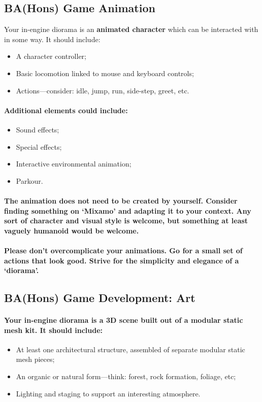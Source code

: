 \documentclass{../../fal_assignment}
\begin{document}
\subsection*{BA(Hons) Game Animation}

Your in-engine diorama is an \textbf{animated character} which can be interacted with in some way. It should include:
\begin{itemize}
\item A character controller;
\item Basic locomotion linked to mouse and keyboard controls;
\item Actions---consider: idle, jump, run, side-step, greet, etc.
\end{itemize}
\paragraph{Additional elements could include:}
\begin{itemize}
\item Sound effects;
\item Special effects;
\item Interactive environmental animation; 
\item Parkour.
\end{itemize}
\paragraph{The animation does not need to be created by yourself. Consider finding something on `Mixamo' and adapting it to your context. Any sort of character and visual style is welcome, but something at least vaguely humanoid would be welcome.}

\paragraph{Please don’t overcomplicate your animations. Go for a small set of actions that look good. Strive for the simplicity and elegance of a ‘diorama’.}

\subsection*{BA(Hons) Game Development: Art}

\paragraph{Your in-engine diorama is a \textbf{3D scene} built out of a modular static mesh kit. It should include:}
\begin{itemize}
\item At least one architectural structure, assembled of separate modular static mesh pieces;
\item An organic or natural form---think: forest, rock formation, foliage, etc;
\item Lighting and staging to support an interesting atmosphere.
\end{itemize}
\end{document}
